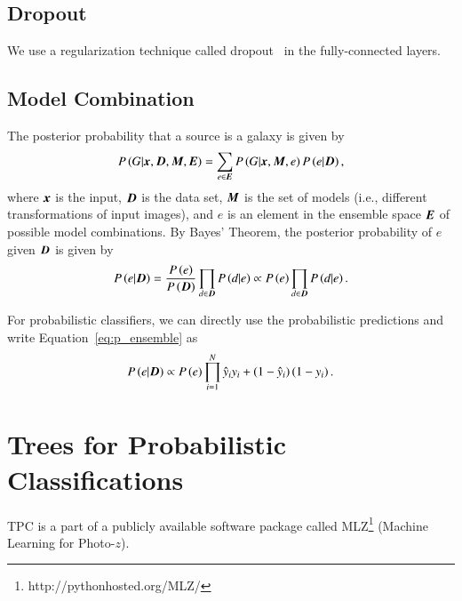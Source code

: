 \documentclass[fleqn,usenatbib]{mnras}
\newcommand{\ie}{{i.e., }}
\begin{document}
\subsection{Dropout}

We use a regularization technique called dropout~\citep{hinton2012improving}
in the fully-connected layers.

\subsection{Model Combination}
  \label{sec:bmc}

The posterior probability that a source is a galaxy is given by
\begin{equation} \label{eq:posterior_bmc}
  P \left(G | \bmath{x}, \bmath{D}, \bmath{M}, \bmath{E} \right)
  = \sum_{e \in \bmath{E}} P \left(G | \bmath{x}, \bmath{M}, e \right)
  P \left(e | \bmath{D} \right),
\end{equation}
where $\bmath{x}$ is the input, $\bmath{D}$ is the data set,
$\bmath{M}$ is the set of models (\ie different transformations of input images),
and $e$ is an element in the ensemble space $\bmath{E}$ of possible model combinations.
By Bayes' Theorem, the posterior probability of $e$ given $\bmath{D}$ is given by
\begin{equation} \label{eq:p_ensemble}
  P \left(e | \bmath{D} \right)
  = \frac{P \left(e \right)}{P \left(\bmath{D} \right)}
  \prod_{d \in \bmath{D}} P \left( d | e \right)
  \propto P \left(e\right) \prod_{d \in \bmath{D}} P \left(d | e \right).
\end{equation}

For probabilistic classifiers,
we can directly use the probabilistic predictions
and write Equation~\ref{eq:p_ensemble} as
\begin{equation} \label{eq:p_ensemble_prob}
  P \left( e | \bmath{D} \right) \propto 
  P \left( e \right) \prod_{i=1}^{N}
  \hat{y}_i y_i + 
  \left(1 - \hat{y}_i\right) \left(1 - y_i\right).
\end{equation}


\section{Trees for Probabilistic Classifications}
  \label{sec:tpc}
  
TPC is a part of a publicly available software package called
\textsc{MLZ}\footnote{http://pythonhosted.org/MLZ/}
(Machine Learning for Photo-$z$).
\end{document}
